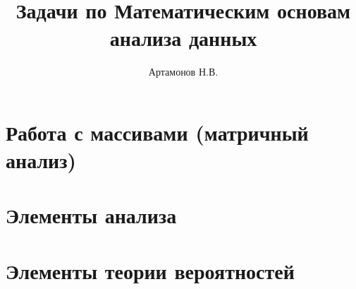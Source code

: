 \documentclass[12pt]{article}
\title{Задачи по Математическим основам анализа данных}
\author{Артамонов Н.В.}
\theoremstyle{remark}
\begin{document}
\maketitle

\tableofcontents

\section{Работа с массивами (матричный анализ)}



\section{Элементы анализа}



\section{Элементы теории вероятностей}






% 
\end{document}
